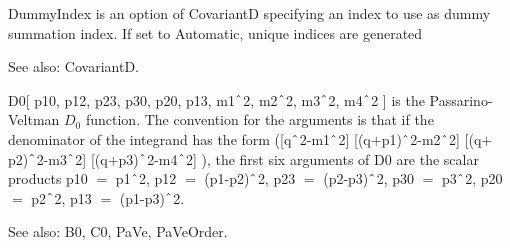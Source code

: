 


DummyIndex is an option of CovariantD specifying an index to use as dummy summation index. If set to Automatic, unique indices are
  generated

See also: CovariantD.



D0[ p10, p12, p23, p30, p20, p13, m1\(\RawWedge\)2, m2\(\RawWedge\)2, m3\(\RawWedge\)2, m4\(\RawWedge\)2 ] is the Passarino-Veltman \({D_0}\) function.
The convention for the arguments is that if the denominator of the integrand has the form ([q\(\RawWedge\)2-m1\(\RawWedge\)2]
  [(q\(+\)p1)\(\RawWedge\)2-m2\(\RawWedge\)2] [(q\(+\)p2)\(\RawWedge\)2-m3\(\RawWedge\)2] [(q\(+\)p3)\(\RawWedge\)2-m4\(\RawWedge\)2] ),
  the first six arguments of D0 are the scalar products p10 \(=\) p1\(\RawWedge\)2, p12 \(=\) (p1-p2)\(\RawWedge\)2, p23 \(=\)
  (p2-p3)\(\RawWedge\)2, p30 \(=\) p3\(\RawWedge\)2, p20 \(=\) p2\(\RawWedge\)2, p13 \(=\) (p1-p3)\(\RawWedge\)2.

See also:  B0, C0, PaVe, PaVeOrder.





